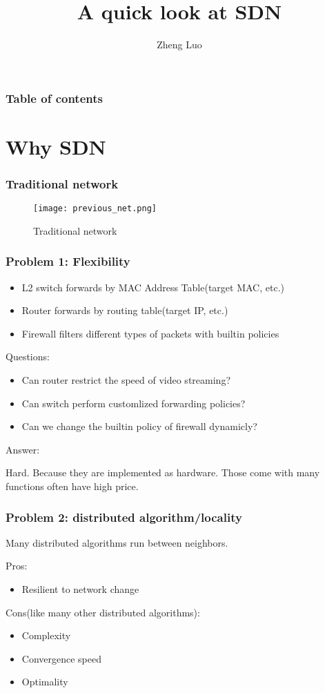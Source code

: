 \documentclass{beamer}
\title{A quick look at SDN}
\author{Zheng Luo}
\begin{document}
\begin{frame}
  \titlepage
\end{frame}

\begin{frame}
    \frametitle{Table of contents}
    \tableofcontents
\end{frame}

\section{Why SDN}

\begin{frame}
    \frametitle{Traditional network}
    \begin{figure}
        \centering
        \texttt{[image: previous\_net.png]}
        \caption{Traditional network}
    \end{figure}
\end{frame}

\begin{frame}
    \frametitle{Problem 1: Flexibility}
    \begin{itemize}
        \item L2 switch forwards by MAC Address Table(target MAC, etc.)
        \item Router forwards by routing table(target IP, etc.)
        \item Firewall filters different types of packets with builtin policies
    \end{itemize}
    Questions:
    \begin{itemize}
        \item Can router restrict the speed of video streaming?
        \item Can switch perform customlized forwarding policies?
        \item Can we change the builtin policy of firewall dynamicly?
    \end{itemize}
    Answer:
    
    Hard. Because they are implemented as hardware. Those come with many functions often have high price.
\end{frame}

\begin{frame}
    \frametitle{Problem 2: distributed algorithm/locality}
    Many distributed algorithms run between neighbors.
    
    Pros:
    \begin{itemize}
        \item Resilient to network change
    \end{itemize}
    
    Cons(like many other distributed algorithms):
    \begin{itemize}
        \item Complexity
        \item Convergence speed
        \item Optimality
    \end{itemize}
    
\end{frame}
\end{document}
